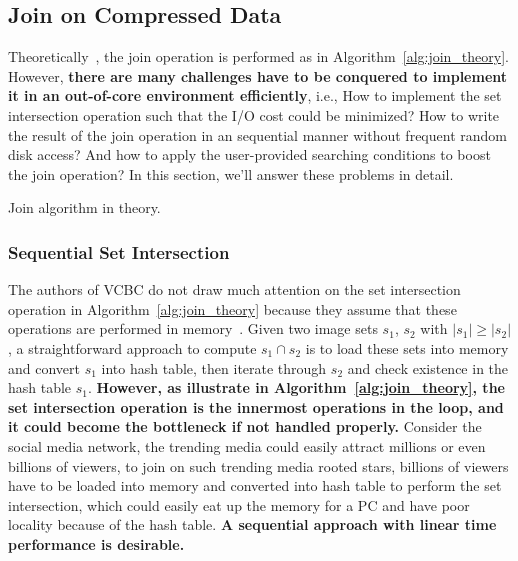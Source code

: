 \subsection{Join on Compressed Data}\label{sec:join_on_compressed_data}
Theoretically~\cite{DBLP:journals/pvldb/QiaoZC17}, the join operation is performed as in Algorithm~\ref{alg:join_theory}.
However, \textbf{there are many challenges have to be conquered to implement it in an out-of-core environment efficiently},
i.e., How to implement the set intersection operation such that the I/O cost could be minimized?
How to write the result of the join operation in an sequential manner without frequent random disk access?
And how to apply the user-provided searching conditions to boost the join operation?
In this section, we'll answer these problems in detail.
\begin{algorithm}[ht]
  \caption{Join algorithm in theory.}\label{alg:join_theory}
\end{algorithm}
\subsubsection{Sequential Set Intersection}\label{sec:sequential_set_intersection}
The authors of VCBC do not draw much attention on the set intersection operation in Algorithm~\ref{alg:join_theory}
because they assume that these operations are performed in memory~\cite{DBLP:journals/pvldb/QiaoZC17}.
Given two image sets $s_1$, $s_2$ with $|s_1| \ge |s_2|$,
a straightforward approach to compute $s_1 \cap s_2$ is to load these sets into memory and convert $s_1$ into hash table,
then iterate through $s_2$ and check existence in the hash table $s_1$.
\textbf{However, as illustrate in Algorithm~\ref{alg:join_theory}, the set intersection operation is the innermost operations in the loop, and it could become the bottleneck if not handled properly.}
Consider the social media network,
the trending media could easily attract millions or even billions of viewers,
to join on such trending media rooted stars,
billions of viewers have to be loaded into memory and converted into hash table to perform the set intersection,
which could easily eat up the memory for a PC and have poor locality because of the hash table.
\textbf{A sequential approach with linear time performance is desirable.}

